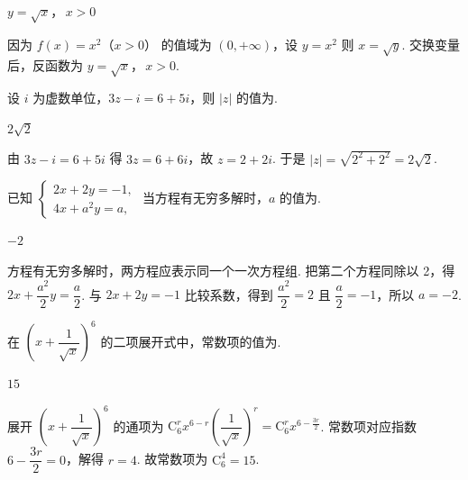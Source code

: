 \begin{answer}
\(y=\sqrt{x}\)，\(\,x>0\)
\end{answer}

\begin{solution}
因为 \(f(x)=x^2\)（\(x>0\)） 的值域为 \((0,+\infty)\)，设 \(y=x^2\) 则 \(x=\sqrt{y}\). 交换变量后，反函数为 \(y=\sqrt{x}\)，\(\,x>0\).
\end{solution}

\begin{problem}
设 \(i\) 为虚数单位，\(3z-i=6+5i\)，则 \(|z|\) 的值为\fillinblank{}.
\end{problem}

\begin{answer}
\(2\sqrt2\)
\end{answer}

\begin{solution}
由 \(3z-i=6+5i\) 得 \(3z=6+6i\)，故 \(z=2+2i\). 于是
\(|z|=\sqrt{2^2+2^2}=2\sqrt2\).
\end{solution}

\begin{problem}
已知 \(\begin{cases}
2x+2y=-1,\\
4x+a^2y=a,
\end{cases}\) 当方程有无穷多解时，\(a\) 的值为\fillinblank{}.
\end{problem}

\begin{answer}
\(-2\)
\end{answer}

\begin{solution}
方程有无穷多解时，两方程应表示同一个一次方程组. 把第二个方程同除以 2，得 \(2x+\dfrac{a^2}{2}y=\dfrac a2\). 与 \(2x+2y=-1\) 比较系数，得到 \(\dfrac{a^2}{2}=2\) 且 \(\dfrac a2=-1\)，所以 \(a=-2\).
\end{solution}

\begin{problem}
在 \(\left(x+\dfrac{1}{\sqrt{x}}\right)^6\) 的二项展开式中，常数项的值为\fillinblank{}.
\end{problem}

\begin{answer}
\(15\)
\end{answer}

\begin{solution}
展开 \(\left(x+\dfrac1{\sqrt x}\right)^6\) 的通项为 \(\mathrm C_6^r x^{6-r}\left(\dfrac1{\sqrt x}\right)^r=\mathrm C_6^r x^{6-\frac{3r}{2}}\).
常数项对应指数 \(6-\dfrac{3r}{2}=0\)，解得 \(r=4\). 故常数项为 \(\mathrm C_6^4=15\).
\end{solution}

